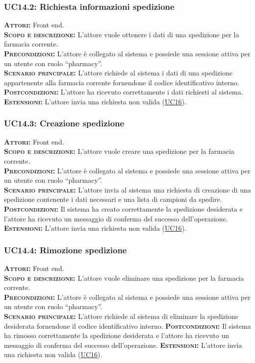 \subsubsection{UC14.2: Richiesta informazioni spedizione}
\label{sec:UC142}
\textsc{\textbf{Attori:}} Front end.\\
\textsc{\textbf{Scopo e descrizione:}} L'attore vuole ottenere i dati di una spedizione per la farmacia corrente.\\
\textsc{\textsc{\textbf{Precondizioni:}}} L'attore è collegato al sistema e possiede una sessione attiva per un utente con ruolo ``pharmacy''.\\
\textsc{\textbf{Scenario principale:}} L'attore richiede al sistema i dati di una spedizione appartenente alla farmacia corrente fornendone il codice identificativo interno.
\textsc{\textbf{Postcondizioni:}} L'attore ha ricevuto correttamente i dati richiesti al sistema.\\
\textsc{\textbf{Estensioni:}} L'attore invia una richiesta non valida (\hyperref[sec:UC16]{UC16}).

\subsubsection{UC14.3: Creazione spedizione}
\label{sec:UC144}
\textsc{\textbf{Attori:}} Front end.\\
\textsc{\textbf{Scopo e descrizione:}} L'attore vuole creare una spedizione per la farmacia corrente.\\
\textsc{\textsc{\textbf{Precondizioni:}}} L'attore è collegato al sistema e possiede una sessione attiva per un utente con ruolo ``pharmacy''.\\
\textsc{\textbf{Scenario principale:}} L'attore invia al sistema una richiesta di creazione di una spedizione contenente i dati necessari e una lista di campioni da spedire.
\textsc{\textbf{Postcondizioni:}} Il sistema ha creato correttamente la spedizione desiderata e l'attore ha ricevuto un messaggio di conferma del successo dell'operazione.
\textsc{\textbf{Estensioni:}} L'attore invia una richiesta non valida (\hyperref[sec:UC16]{UC16}).

\subsubsection{UC14.4: Rimozione spedizione}
\label{sec:UC144}
\textsc{\textbf{Attori:}} Front end.\\
\textsc{\textbf{Scopo e descrizione:}} L'attore vuole eliminare una spedizione per la farmacia corrente.\\
\textsc{\textsc{\textbf{Precondizioni:}}} L'attore è collegato al sistema e possiede una sessione attiva per un utente con ruolo ``pharmacy''.\\
\textsc{\textbf{Scenario principale:}} L'attore richiede al sistema di eliminare la spedizione desiderata fornendone il codice identificativo interno.
\textsc{\textbf{Postcondizioni:}} Il sistema ha rimosso correttamente la spedizione desiderata e l'attore ha ricevuto un messaggio di conferma del successo dell'operazione.
\textsc{\textbf{Estensioni:}} L'attore invia una richiesta non valida (\hyperref[sec:UC16]{UC16}).

